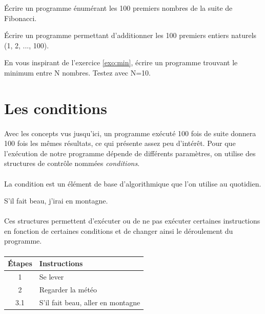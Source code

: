 \documentclass[11pt, a4paper]{book}
\begin{document}
\begin{exercice}
Écrire un programme énumérant les 100 premiers nombres de la suite de Fibonacci.
\end{exercice}

\begin{exercice}
Écrire un programme permettant d'additionner les 100 premiers entiers naturels (1, 2, ..., 100). %
\end{exercice}

\begin{exercice}
En vous inspirant de l'exercice \ref{exo:min}, écrire un programme trouvant le minimum entre N nombres.
Testez avec N=10.
\end{exercice}


\newpage

\section{Les conditions}

\paragraph{} Avec les concepts vus jusqu'ici, un programme exécuté 100 fois de suite donnera 100 fois les mêmes résultats, ce qui présente assez peu d'intérêt. Pour que l'exécution de notre programme dépende de différents paramètres, on utilise des structures de contrôle nommées \textit{conditions}.

\paragraph{} La condition est un élément de base d'algorithmique que l'on utilise au quotidien.
 \begin{example} S'il fait beau, j'irai en montagne. \end{example}


\paragraph{} Ces structures permettent d'exécuter ou de ne pas exécuter certaines instructions en fonction de certaines conditions et de changer ainsi le déroulement du programme.

\paragraph{}
\begin{tabular}{ c  l  }
     Étapes & Instructions \\ \hline
     1 & Se lever  \\ 
     2 & Regarder la météo  \\
     3.1 & S'il fait beau, aller en montagne  \\
\end{tabular}
\end{document}
